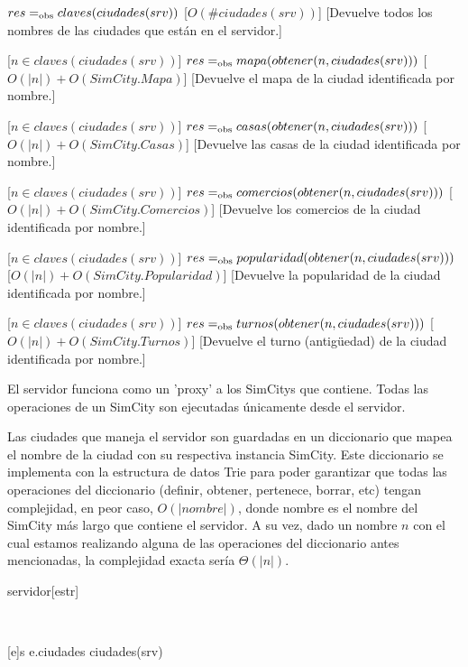 \begin{Interfaz}
{$res =_{\mathrm{obs}} claves(ciudades(srv))$}
[$O(\#ciudades(srv))$]
[Devuelve todos los nombres de las ciudades que están en el servidor.]

[$n \in claves(ciudades(srv))$]
{$res =_{\mathrm{obs}} mapa(obtener(n, ciudades(srv)))$}
[$O(|n|) + O(SimCity.Mapa)$]
[Devuelve el mapa de la ciudad identificada por nombre.]

[$n \in claves(ciudades(srv))$]
{$res =_{\mathrm{obs}} casas(obtener(n, ciudades(srv)))$}
[$O(|n|) + O(SimCity.Casas)$]
[Devuelve las casas de la ciudad identificada por nombre.]

[$n \in claves(ciudades(srv))$]
{$res =_{\mathrm{obs}} comercios(obtener(n, ciudades(srv)))$}
[$O(|n|) + O(SimCity.Comercios)$]
[Devuelve los comercios de la ciudad identificada por nombre.]

[$n \in claves(ciudades(srv))$]
{$res =_{\mathrm{obs}} popularidad(obtener(n, ciudades(srv)))$}
[$O(|n|) + O(SimCity.Popularidad)$]
[Devuelve la popularidad de la ciudad identificada por nombre.]

[$n \in claves(ciudades(srv))$]
{$res =_{\mathrm{obs}} turnos(obtener(n, ciudades(srv)))$}
[$O(|n|) + O(SimCity.Turnos)$]
[Devuelve el turno (antigüedad) de la ciudad identificada por nombre.]

\end{Interfaz}

\begin{Representacion}

El servidor funciona como un 'proxy' a los SimCitys que contiene. Todas las operaciones de un SimCity son ejecutadas únicamente desde el servidor.

Las ciudades que maneja el servidor son guardadas en un diccionario que mapea el nombre de la ciudad con su respectiva instancia SimCity. Este diccionario se implementa con la estructura de datos Trie para poder garantizar que todas las operaciones del diccionario (definir, obtener, pertenece, borrar, etc) tengan complejidad, en peor caso, $O(|nombre|)$, donde nombre es el nombre del SimCity más largo que contiene el servidor. A su vez, dado un nombre $n$ con el cual estamos realizando alguna de las operaciones del diccionario antes mencionadas, la complejidad exacta sería $\Theta(|n|)$.

\begin{Estructura}{servidor}[estr]
    \begin{Tupla}[estr]
    \end{Tupla}
\end{Estructura}


~

[e]{s}{
    e.ciudades \igobs ciudades(srv)
}
\end{Representacion}

